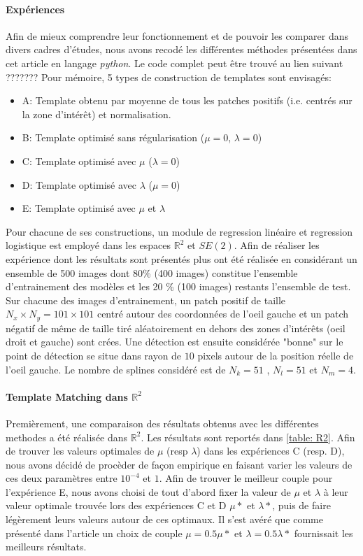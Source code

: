 \documentclass{article}
\begin{document}
\paragraph{Expériences}

Afin de mieux comprendre leur fonctionnement et de pouvoir les comparer dans 
divers cadres d'études, nous avons recodé les différentes méthodes présentées dans cet article 
en langage \textit{python}. Le code complet peut être trouvé au lien suivant ???????
Pour mémoire, 5 types de construction de templates sont envisagés:
\begin{itemize}
    \item A: Template obtenu par moyenne de tous les patches positifs (i.e. centrés sur la zone d'intérêt) et normalisation.
    \item B: Template optimisé sans régularisation ($\mu =0$, $\lambda = 0$)
    \item C: Template optimisé avec $\mu$ ($\lambda=0$)
    \item D: Template optimisé avec $\lambda$ ($\mu = 0$)
    \item E: Template optimisé avec $\mu$ et $\lambda$
\end{itemize}

Pour chacune de ses constructions, un module de regression linéaire et regression logistique est employé dans 
les espaces $\mathbb{R}^2$ et $SE(2)$. Afin de réaliser les expérience dont les résultats sont présentés plus 
ont été réalisée en considérant un ensemble de 500 images dont 80\% (400 images) constitue l'ensemble d'entrainement 
des modèles et les 20 \% (100 images) restants l'ensemble de test. Sur chacune des images d'entrainement, un patch 
positif de taille $N_x \times N_y = 101 \times 101$ centré autour des coordonnées de l'oeil gauche et un patch négatif 
de même de taille tiré aléatoirement en dehors des zones d'intérêts (oeil droit et gauche) sont crées. Une détection est 
ensuite considérée "bonne" sur le point de détection se situe dans rayon de $10$ pixels autour de la position réelle de l'oeil 
gauche. Le nombre de splines considéré est de $N_k = 51$ , $N_l =51$ et $N_m = 4$.



\paragraph{Template Matching dans $\mathbb{R}^2$}
Premièrement, une comparaison des résultats obtenus avec les différentes methodes a été réalisée dans $\mathbb{R}^2$.
Les résultats sont reportés dans \ref{table: R2}. Afin de trouver les valeurs optimales de $\mu$ (resp $\lambda$) dans les expériences C (resp. D), nous avons décidé 
de procèder de façon empirique en faisant varier les valeurs de ces deux paramètres entre $10^{-4}$ et $1$. Afin de trouver le meilleur couple pour l'expérience E, nous avons 
choisi de tout d'abord fixer la valeur de $\mu$ et $\lambda$ à leur valeur optimale trouvée lors des expériences C et D $\mu*$ et $\lambda*$, puis de faire légèrement leurs valeurs autour de ces optimaux.
Il s'est avéré que comme présenté dans l'article un choix de couple $\mu = 0.5 \mu*$ et $\lambda = 0.5 \lambda*$ fournissait les meilleurs résultats.
\end{document}
